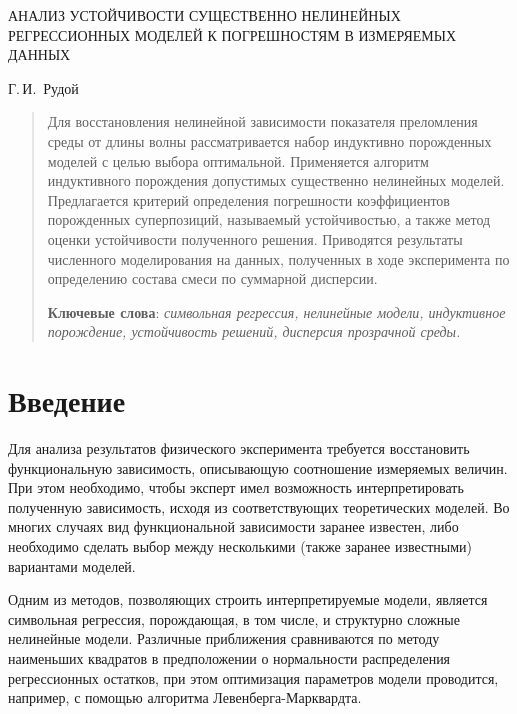 \documentclass[12pt,a4paper]{article}
\theoremstyle{definition}
\begin{document}
\lstset{language=C++}

\begin{center}
  АНАЛИЗ УСТОЙЧИВОСТИ СУЩЕСТВЕННО НЕЛИНЕЙНЫХ РЕГРЕССИОННЫХ МОДЕЛЕЙ К ПОГРЕШНОСТЯМ В ИЗМЕРЯЕМЫХ
  ДАННЫХ

  \bigskip
  Г.\,И.~Рудой
\end{center}

\begin{abstract}
  Для восстановления нелинейной зависимости показателя преломления среды от длины
  волны рассматривается набор индуктивно порожденных моделей с целью выбора оптимальной.
  Применяется алгоритм индуктивного порождения допустимых существенно
  нелинейных моделей. Предлагается критерий определения погрешности коэффициентов порожденных
  суперпозиций, называемый устойчивостью, а также метод оценки устойчивости полученного решения.
  Приводятся результаты численного моделирования на данных, полученных в ходе
  эксперимента по определению состава смеси по суммарной дисперсии.

  \bigskip
  \textbf{Ключевые слова}: \emph{символьная регрессия, нелинейные модели, индуктивное порождение,
	устойчивость решений, дисперсия прозрачной среды.}
\end{abstract}

\section*{Введение}

Для анализа результатов физического эксперимента требуется восстановить функциональную зависимость, описывающую соотношение измеряемых величин. При этом необходимо, чтобы эксперт имел возможность интерпретировать полученную зависимость, исходя из соответствующих теоретических моделей. Во многих случаях вид функциональной зависимости заранее известен, либо необходимо сделать выбор между несколькими (также заранее известными) вариантами моделей.

Одним из методов, позволяющих строить интерпретируемые модели, является символьная регрессия\cite{davidson:2000:snrea,reference/ml/X10vc,StrijovW10,Strijov08InductMethods,Rudoy13}, порождающая, в том числе, и структурно сложные нелинейные модели. Различные приближения сравниваются по методу наименьших квадратов в предположении о нормальности распределения регрессионных остатков, при этом оптимизация параметров модели проводится, например, с помощью алгоритма Левенберга-Марквардта\cite{Marquardt1963Algorithm,more:78}.
\end{document}
